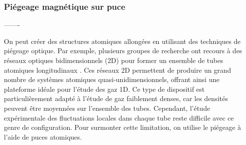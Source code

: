 \subsubsection{Piégeage magnétique sur puce}
\label{sec:piegeage_puce}

%

-------

On peut créer des structures atomiques allongées en utilisant des techniques de piégeage optique. Par exemple, plusieurs groupes de recherche ont recours à des réseaux optiques bidimensionnels (2D) pour former un ensemble de tubes atomiques longitudinaux \cite{Kinoshita2004,LaburtheTolra2004,Paredes2004,Moritz2003}. Ces réseaux 2D permettent de produire un grand nombre de systèmes atomiques quasi-unidimensionnels, offrant ainsi une plateforme idéale pour l’étude des gaz 1D. Ce type de dispositif est particulièrement adapté à l’étude de gaz faiblement denses, car les densités peuvent être moyennées sur l’ensemble des tubes. Cependant, l’étude expérimentale des fluctuations locales dans chaque tube reste difficile avec ce genre de configuration. Pour surmonter cette limitation, on utilise le piégeage à l’aide de puces atomiques.

